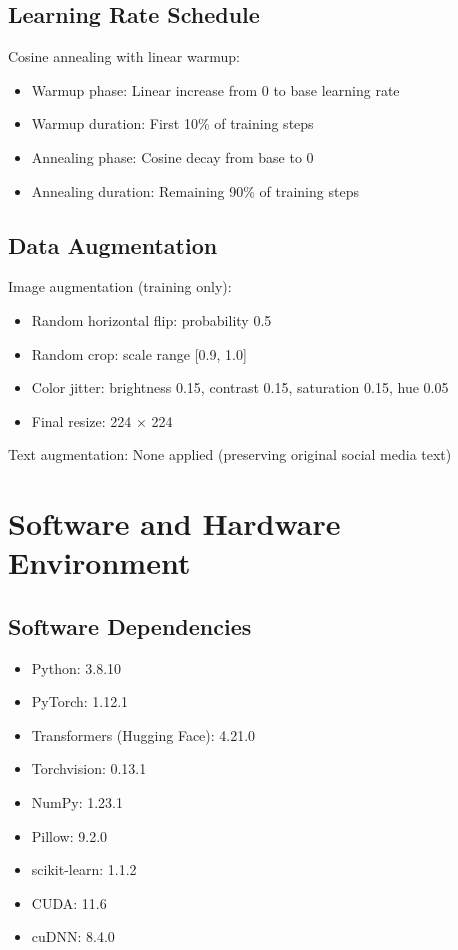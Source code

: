 \documentclass[12pt,a4paper]{report}
\begin{document}
\subsection{Learning Rate Schedule}

Cosine annealing with linear warmup:
\begin{itemize}
\item Warmup phase: Linear increase from 0 to base learning rate
\item Warmup duration: First 10\% of training steps
\item Annealing phase: Cosine decay from base to 0
\item Annealing duration: Remaining 90\% of training steps
\end{itemize}

\subsection{Data Augmentation}

Image augmentation (training only):
\begin{itemize}
\item Random horizontal flip: probability 0.5
\item Random crop: scale range [0.9, 1.0]
\item Color jitter: brightness 0.15, contrast 0.15, saturation 0.15, hue 0.05
\item Final resize: 224 × 224
\end{itemize}

Text augmentation: None applied (preserving original social media text)

\section{Software and Hardware Environment}

\subsection{Software Dependencies}

\begin{itemize}
\item Python: 3.8.10
\item PyTorch: 1.12.1
\item Transformers (Hugging Face): 4.21.0
\item Torchvision: 0.13.1
\item NumPy: 1.23.1
\item Pillow: 9.2.0
\item scikit-learn: 1.1.2
\item CUDA: 11.6
\item cuDNN: 8.4.0
\end{itemize}
\end{document}

